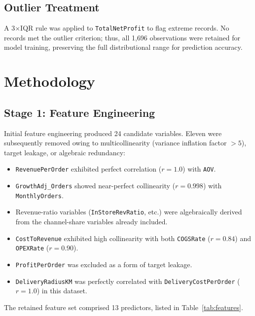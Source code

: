 \documentclass[10pt,a4paper,twocolumn]{article}
\begin{document}
\subsection{Outlier Treatment}

A 3$\times$IQR rule was applied to \texttt{TotalNetProfit} to flag extreme records.
No records met the outlier criterion; thus, all 1{,}696 observations were retained
for model training, preserving the full distributional range for prediction accuracy.

\section{Methodology}
\label{sec:methodology}

\subsection{Stage 1: Feature Engineering}
\label{sec:features}

Initial feature engineering produced 24 candidate variables. Eleven were subsequently
removed owing to multicollinearity (variance inflation factor $> 5$), target leakage,
or algebraic redundancy:

\begin{itemize}[itemsep=1pt, leftmargin=*]
  \item \texttt{RevenuePerOrder} exhibited perfect correlation ($r = 1.0$) with \texttt{AOV}.
  \item \texttt{GrowthAdj\_Orders} showed near-perfect collinearity ($r = 0.998$) with \texttt{MonthlyOrders}.
  \item Revenue-ratio variables (\texttt{InStoreRevRatio}, etc.) were algebraically
        derived from the channel-share variables already included.
  \item \texttt{CostToRevenue} exhibited high collinearity with both \texttt{COGSRate}
        ($r = 0.84$) and \texttt{OPEXRate} ($r = 0.90$).
  \item \texttt{ProfitPerOrder} was excluded as a form of target leakage.
  \item \texttt{DeliveryRadiusKM} was perfectly correlated with
        \texttt{DeliveryCostPerOrder} ($r = 1.0$) in this dataset.
\end{itemize}

The retained feature set comprised 13 predictors, listed in Table~\ref{tab:features}.
\end{document}
